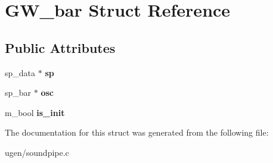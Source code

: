 \hypertarget{structGW__bar}{}\section{G\+W\+\_\+bar Struct Reference}
\label{structGW__bar}
\subsection*{Public Attributes}
\begin{DoxyCompactItemize}
\item 
\hypertarget{structGW__bar_aaa8645e4d907e581375cf6405f6f8ff2}{}\label{structGW__bar_aaa8645e4d907e581375cf6405f6f8ff2} 
sp\+\_\+data $\ast$ {\bfseries sp}
\item 
\hypertarget{structGW__bar_a848afa3a7a5df3169677548997c36322}{}\label{structGW__bar_a848afa3a7a5df3169677548997c36322} 
sp\+\_\+bar $\ast$ {\bfseries osc}
\item 
\hypertarget{structGW__bar_a95460e85eceb2d1f133f0b2b3ffcaa87}{}\label{structGW__bar_a95460e85eceb2d1f133f0b2b3ffcaa87} 
m\+\_\+bool {\bfseries is\+\_\+init}
\end{DoxyCompactItemize}


The documentation for this struct was generated from the following file\+:\begin{DoxyCompactItemize}
\item 
ugen/soundpipe.\+c\end{DoxyCompactItemize}
